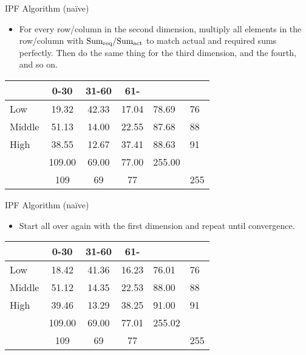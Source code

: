 \documentclass{beamer}
\begin{document}
\begin{frame}{IPF Algorithm (naïve)}
\begin{itemize}
\item For every row/column in the second dimension, multiply all
  elements in the row/column with \(\text{Sum}_{\text{req}}{}/\text{Sum}_{\text{act}}{}\)
  to match actual and required sums perfectly. Then do the same thing
  for the third dimension, and the fourth, and so on.
\end{itemize}

\begin{table}
\centering
\begin{tabular}{l||c c c||l|l}
 & 0-30 & 31-60 & 61- & \sumact{} & \sumreq{}\\
\hline \hline
Low & 19.32 & 42.33 & 17.04 & 78.69 & 76 \\
Middle & 51.13 & 14.00 & 22.55 & 87.68 & 88 \\
High & 38.55 & 12.67 & 37.41 & 88.63 & 91 \\
\hline \hline
\sumact{} & 109.00 & 69.00 & 77.00 & 255.00 & \\
\hline
\sumreq{} & 109 & 69 & 77 & & 255 \\
\end{tabular}
\end{table}
\end{frame}


\begin{frame}{IPF Algorithm (naïve)}
\begin{itemize}
\item Start all over again with the first dimension and repeat until
  convergence.
\end{itemize}

\begin{table}
\centering
\begin{tabular}{l||c c c||l|l}
         &   0-30 & 31-60 & 61- & \sumact{} & \sumreq{}\\
\hline \hline
Low      &  18.42 & 41.36 & 16.23 & 76.01 & 76 \\
Middle   &  51.12 & 14.35 & 22.53 & 88.00 & 88 \\
High     &  39.46 & 13.29 & 38.25 & 91.00 & 91 \\
\hline \hline
\sumact{}& 109.00 & 69.00 & 77.01 & 255.02 & \\
\hline
\sumreq{}& 109    & 69 & 77 & & 255 \\
\end{tabular}
\end{table}
\end{frame}
\end{document}
